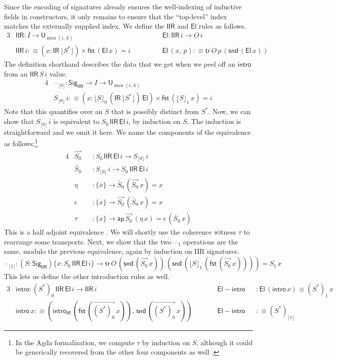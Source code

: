 \documentclass[acmsmall,screen,review,anonymous]{acmart}
\newcommand{\msf}[1]{{\mathsf{#1}}}
\newcommand{\U}{\msf{U}}
\newcommand{\El}{\msf{El}}
\newcommand{\Sig}{\msf{Sig}}
\newcommand{\blank}{{\mathord{\hspace{1pt}\text{--}\hspace{1pt}}}}
\newcommand{\IR}{\msf{IR}}
\newcommand{\intro}{\msf{intro}}
\newcommand{\tr}{\msf{tr}}
\newcommand{\fst}{\msf{fst}}
\newcommand{\snd}{\msf{snd}}
\newcommand{\IIR}{\msf{IIR}}
\newcommand{\Sigr}[1]{\lfloor #1 \rfloor}
\newcommand{\floord}[1]{\lfloor #1 \rfloor}
\newcommand{\ora}[1]{\overrightarrow{#1}}
\newcommand{\ola}[1]{\overleftarrow{#1}}
\newcommand{\ap}{\msf{ap}}
\begin{document}
Since the encoding of signatures already ensures the well-indexing of inductive fields in
constructors, it only remains to ensure that the ``top-level'' index matches the externally supplied
index. We define the $\IIR$ and $\El$ rules as follows.
\begin{alignat*}{3}
  &\IIR : I \to \U_{\max(i,\,k)}                         && \El : \IIR\,i \to O\,i \\
  &\IIR\,i :\equiv (x : \IR\,\Sigr{S^*}) \times \fst\,(\El\,x) = i \hspace{3em}&& \El\,(x,\,p) :\equiv \tr\,O\,p\,(\snd\,(\El\,x))
\end{alignat*}
The definition shorthand describes the data that we get when we peel off an $\intro$ from an $\IIR\,S\,i$ value.
\begin{alignat*}{4}
  &\blank_{\floord{0}} : \Sig_\IIR \to I \to \U_{\max(i,\,k)}\\
  &S_{\floord{0}}\,i :\equiv (x : \floord{S}_0\,(\IR\,\floord{S^*})\,\El) \times \fst\,(\floord{S}_1\,x) = i
\end{alignat*}
Note that this quantifies over an $S$ that is possibly distinct from $S^*$. Now, we can show that
$S_{\floord{0}}\,i$ is equivalent to $S_0\,\IIR\,\El\,i$, by induction on $S$. The induction is
straightforward and we omit it here. We name the components of the equivalence as
follows:\footnote{In the Agda formalization, we compute $\tau$ by induction on $S$, although it
could be generically recovered from the other four components as well \cite[Section~4.2]{hottbook}.}
\begin{alignat*}{4}
  &\ora{S_0} &&: S_0\,\IIR\,\El\,i \to S_{\floord{0}}\,i \\
  &\ola{S_0} &&: S_{\floord{0}}\,i \to S_0\,\IIR\,\El\,i \\
  &\eta      &&: \{x\} \to \ola{S_0}\,(\ora{S_0}\,x) = x \\
  &\epsilon  &&: \{x\} \to \ora{S_0}\,(\ola{S_0}\,x) = x \\
  &\tau      &&: \{x\} \to \ap\,\ora{S_0}\,(\eta\,x) = \epsilon\,(\ola{S_0}\,x)
\end{alignat*}
This is a half adjoint equivalence \cite[Section~4.2]{hottbook}. We will shortly use the coherence
witness $\tau$ to rearrange some transports. Next, we show that the two $\blank_1$ operations are
the same, modulo the previous equivalence, again by induction on IIR signatures.
\[\blank_{\floord{1}} : (S : \Sig_\IIR)\{x : S_0\,\IIR\,\El\,i\} \to \tr\,O\,(\snd\,(\ora{S_0}\,x))\,(\snd\,(\floord{S}_1\,(\fst\,(\ora{S_0}\,x)))) = S_1\,x\]
This lets us define the other introduction rules as well.
\begin{alignat*}{3}
  &\intro    : (S^*)_0\,\IIR\,\El\,i \to \IIR\,i && \msf{El\!\!-\!\!intro} && : \El\,(\intro\,x) \equiv (S^*)_1\,x \\
  &\intro\,x :\equiv (\intro_\IR\,(\fst\,(\ora{(S^*)_0}\,x)),\,\snd\,(\ora{(S^*)_0}\,x)) \quad\quad&& \msf{El\!\!-\!\!intro} && :\equiv (S^*)_{\floord{1}}
\end{alignat*}
\end{document}
